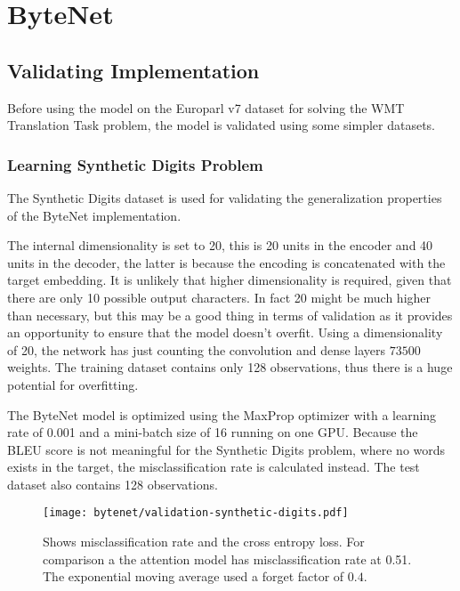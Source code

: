 
\section{ByteNet}

\subsection{Validating Implementation}

Before using the model on the Europarl v7 dataset for solving the WMT Translation Task problem, the model is validated using some simpler datasets.

\subsubsection{Learning Synthetic Digits Problem}

The Synthetic Digits dataset is used for validating the generalization properties of the ByteNet implementation.

The internal dimensionality is set to 20, this is 20 units in the encoder and 40 units in the decoder, the latter is because the encoding is concatenated with the target embedding. It is unlikely that higher dimensionality is required, given that there are only 10 possible output characters. In fact 20 might be much higher than necessary, but this may be a good thing in terms of validation as it provides an opportunity to ensure that the model doesn't overfit. Using a dimensionality of 20, the network has just counting the convolution and dense layers $73500$ weights. The training dataset contains only 128 observations, thus there is a huge potential for overfitting.

The ByteNet model is optimized using the MaxProp optimizer with a learning rate of 0.001 and a mini-batch size of 16 running on one GPU. Because the BLEU score is not meaningful for the Synthetic Digits problem, where no words exists in the target, the misclassification rate is calculated instead. The test dataset also contains 128 observations.

\begin{figure}[h]
    \centering
    \texttt{[image: bytenet/validation-synthetic-digits.pdf]}
    \caption{Shows misclassification rate and the cross entropy loss. For comparison a the attention model has misclassification rate at 0.51. The exponential moving average used a forget factor of $0.4$.}
    \label{fig:result:bytenet:digits}
\end{figure}

